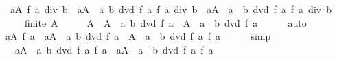 \begin{isabellebody}
\ \ {\isacartoucheopen}{\isacharparenleft}{\kern0pt}{\isasymSum}a{\isasymin}A{\isachardot}{\kern0pt}\ f\ a{\isacharparenright}{\kern0pt}\ div\ b\ {\isacharequal}{\kern0pt}\ {\isacharparenleft}{\kern0pt}{\isasymSum}a{\isasymin}A\ {\isasyminter}\ {\isacharbraceleft}{\kern0pt}a{\isachardot}{\kern0pt}\ b\ dvd\ f\ a{\isacharbraceright}{\kern0pt}{\isachardot}{\kern0pt}\ f\ a\ div\ b{\isacharparenright}{\kern0pt}\ {\isacharplus}{\kern0pt}\ {\isacharparenleft}{\kern0pt}{\isasymSum}a{\isasymin}A\ {\isasyminter}\ {\isacharbraceleft}{\kern0pt}a{\isachardot}{\kern0pt}\ {\isasymnot}\ b\ dvd\ f\ a{\isacharbraceright}{\kern0pt}{\isachardot}{\kern0pt}\ f\ a{\isacharparenright}{\kern0pt}\ div\ b{\isacartoucheclose}\isanewline
\ \ \ \ \ {\isacartoucheopen}finite\ A{\isacartoucheclose}\isanewline
%
\isadelimproof
%
\endisadelimproof
%
\isatagproof
{}\isamarkupfalse%
\ {\isacharminus}{\kern0pt}\isanewline
\ \ \isamarkupfalse%
\ {\isacartoucheopen}A\ {\isacharequal}{\kern0pt}\ A\ {\isasyminter}\ {\isacharbraceleft}{\kern0pt}a{\isachardot}{\kern0pt}\ b\ dvd\ f\ a{\isacharbraceright}{\kern0pt}\ {\isasymunion}\ A\ {\isasyminter}\ {\isacharbraceleft}{\kern0pt}a{\isachardot}{\kern0pt}\ {\isasymnot}\ b\ dvd\ f\ a{\isacharbraceright}{\kern0pt}{\isacartoucheclose}\isanewline
\ \ \ \ \isamarkupfalse%
\ auto\isanewline
\ \ \isamarkupfalse%
\ \isamarkupfalse%
\ {\isacartoucheopen}{\isacharparenleft}{\kern0pt}{\isasymSum}a{\isasymin}A{\isachardot}{\kern0pt}\ f\ a{\isacharparenright}{\kern0pt}\ {\isacharequal}{\kern0pt}\ {\isacharparenleft}{\kern0pt}{\isasymSum}a{\isasymin}A\ {\isasyminter}\ {\isacharbraceleft}{\kern0pt}a{\isachardot}{\kern0pt}\ b\ dvd\ f\ a{\isacharbraceright}{\kern0pt}\ {\isasymunion}\ A\ {\isasyminter}\ {\isacharbraceleft}{\kern0pt}a{\isachardot}{\kern0pt}\ {\isasymnot}\ b\ dvd\ f\ a{\isacharbraceright}{\kern0pt}{\isachardot}{\kern0pt}\ f\ a{\isacharparenright}{\kern0pt}{\isacartoucheclose}\isanewline
\ \ \ \ \isamarkupfalse%
\ simp\isanewline
\ \ \isamarkupfalse%
\ \isamarkupfalse%
\ {\isacartoucheopen}{\isasymdots}\ {\isacharequal}{\kern0pt}\ {\isacharparenleft}{\kern0pt}{\isasymSum}a{\isasymin}A\ {\isasyminter}\ {\isacharbraceleft}{\kern0pt}a{\isachardot}{\kern0pt}\ b\ dvd\ f\ a{\isacharbraceright}{\kern0pt}{\isachardot}{\kern0pt}\ f\ a{\isacharparenright}{\kern0pt}\ {\isacharplus}{\kern0pt}\ {\isacharparenleft}{\kern0pt}{\isasymSum}a{\isasymin}A\ {\isasyminter}\ {\isacharbraceleft}{\kern0pt}a{\isachardot}{\kern0pt}\ {\isasymnot}\ b\ dvd\ f\ a{\isacharbraceright}{\kern0pt}{\isachardot}{\kern0pt}\ f\ a{\isacharparenright}{\kern0pt}{\isacartoucheclose}\isanewline

\end{isabellebody}
